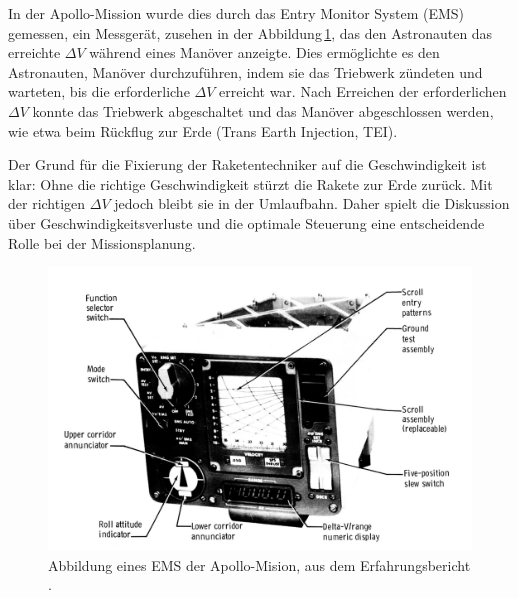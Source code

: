 In der Apollo-Mission wurde dies durch das Entry Monitor System (EMS) gemessen, ein Messgerät, zusehen in der Abbildung\,\ref{fig:leo:ems}, das den Astronauten das erreichte \(\Delta V\) während eines Manöver anzeigte. 
%
%
Dies ermöglichte es den Astronauten, Manöver durchzuführen, indem sie das Triebwerk zündeten und warteten, bis die erforderliche \(\Delta V\) erreicht war. 
Nach Erreichen der erforderlichen \(\Delta V\) konnte das Triebwerk abgeschaltet und das Manöver abgeschlossen werden, wie etwa beim Rückflug zur Erde (Trans Earth Injection, TEI).
%
%

Der Grund für die Fixierung der Raketentechniker auf die Geschwindigkeit ist klar: Ohne die richtige Geschwindigkeit stürzt die Rakete zur Erde zurück. 
Mit der richtigen \(\Delta V\) jedoch bleibt sie in der Umlaufbahn. Daher spielt die Diskussion über Geschwindigkeitsverluste und die optimale Steuerung eine entscheidende Rolle bei der Missionsplanung.
%
%

\begin{figure}
	\centering
	\includegraphics[width=\linewidth]{papers/leo/Grafiken/EMS.png}
	\caption{Abbildung eines EMS der Apollo-Mision, aus dem Erfahrungsbericht \cite{leo:wilson1976apollo}.}
	\label{fig:leo:ems}
\end{figure}


